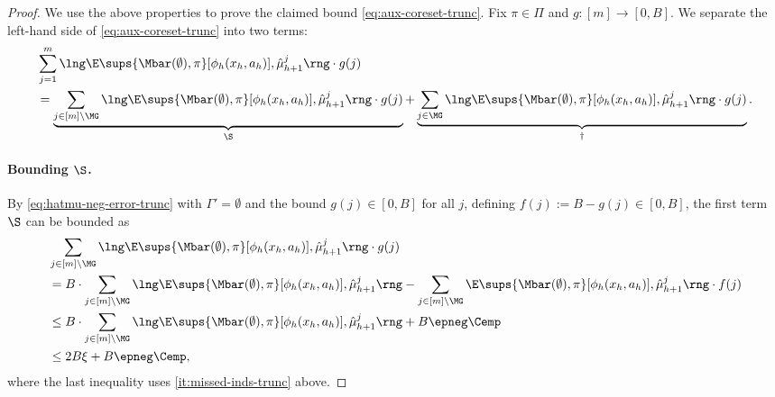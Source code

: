 \documentclass[11pt, oneside]{article}
\theoremstyle{plain}
\theoremstyle{definition}
\numberwithin{theorem}{section}
\renewcommand{\^}[1]{^{(#1)}}
\begin{document}
\begin{proof}
We use the above properties to prove the claimed bound \cref{eq:aux-coreset-trunc}. Fix $\pi \in \Pi$ and $g: [m]\to[0,B]$. We separate the left-hand side of \cref{eq:aux-coreset-trunc} into two terms:
\begin{align*} 
&\sum_{j=1}^m \lng \E\sups{\Mbar(\emptyset), \pi}[\phi_h(x_h, a_h)], \hat \mu_{h+1}^j \rng \cdot g(j) \\
&= \underbrace{\sum_{j \in [m] \setminus \MG} \lng \E\sups{\Mbar(\emptyset), \pi}[\phi_h(x_h, a_h)], \hat \mu_{h+1}^j \rng \cdot g(j)}_{\S} + \underbrace{\sum_{j\in \MG} \lng \E\sups{\Mbar(\emptyset), \pi}[\phi_h(x_h, a_h)], \hat \mu_{h+1}^j \rng \cdot g(j)}_{\dag}.
\end{align*}

\paragraph{Bounding $\S$.} By \cref{eq:hatmu-neg-error-trunc} with $\Gamma' = \emptyset$ and the bound $g(j) \in [0,B]$ for all $j$, defining $f(j) := B - g(j) \in [0,B]$, the first term $\S$ can be bounded as %
\begin{align*}
  & \sum_{j \in [m] \backslash \MG} \lng \E\sups{\Mbar(\emptyset), \pi}[\phi_h(x_h, a_h)], \hat \mu_{h+1}^j \rng \cdot g(j)\\
  &= B \cdot \sum_{j \in [m] \backslash \MG} \lng \E\sups{\Mbar(\emptyset), \pi}[\phi_h(x_h, a_h)], \hat \mu_{h+1}^j \rng  - \sum_{j \in [m] \backslash \MG}\E\sups{\Mbar(\emptyset), \pi}[\phi_h(x_h, a_h)], \hat \mu_{h+1}^j \rng \cdot f(j) \\
&\leq  B \cdot \sum_{j \in [m] \backslash \MG} \lng \E\sups{\Mbar(\emptyset), \pi}[\phi_h(x_h, a_h)], \hat \mu_{h+1}^j \rng + B\epneg \Cemp\\
&\leq   2B\xi + B \epneg \Cemp,
\end{align*}
where the last inequality uses \cref{it:missed-inds-trunc} above. 


\end{proof}
\end{document}
